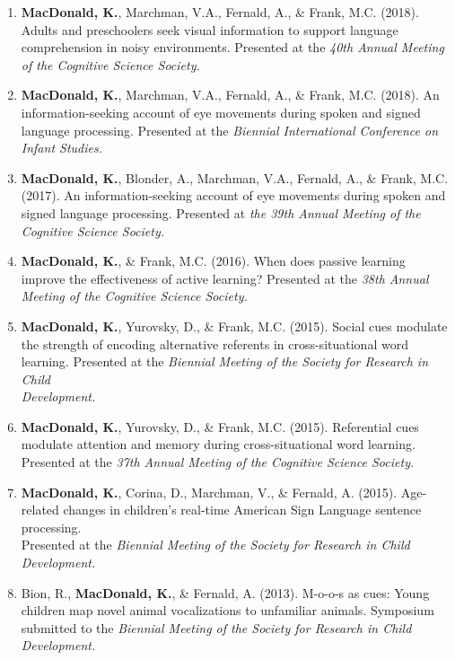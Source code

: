 \documentclass[10pt]{article}
\begin{document}
\begin{enumerate}

        \item {\bf MacDonald, K.}, Marchman, V.A., Fernald, A., \& Frank, M.C. (2018). Adults and preschoolers 
                seek visual information to support language comprehension in noisy environments. 
                Presented at the \emph{40th Annual Meeting of the Cognitive Science Society.}

        \item {\bf MacDonald, K.}, Marchman, V.A., Fernald, A., \& Frank, M.C. (2018). An information-seeking 
                account of eye movements during spoken and signed language processing. Presented at the \emph{Biennial 
                International Conference on Infant Studies.}

        \item {\bf MacDonald, K.}, Blonder, A., Marchman, V.A., Fernald, A., \& Frank, M.C. (2017). An information-seeking 
                account of eye movements during spoken and signed language processing. Presented at \emph{the 39th Annual 
                Meeting of the Cognitive Science Society.}

        \item {\bf MacDonald, K.}, \& Frank, M.C. (2016). When does passive learning improve the effectiveness of active 
                learning? Presented at the \emph{38th Annual Meeting of the Cognitive Science Society.}

        \item {\bf MacDonald, K.}, Yurovsky, D., \& Frank, M.C. (2015). Social cues modulate the strength of encoding 
                alternative referents in cross-situational word learning. Presented at the \emph{Biennial Meeting of 
                the Society for Research in Child \\ Development.}
        
        \item {\bf MacDonald, K.}, Yurovsky, D., \& Frank, M.C. (2015). Referential cues modulate attention and memory 
                during cross-situational word learning. Presented at the \emph{37th Annual Meeting of the Cognitive 
                Science Society.}
         
        \item {\bf MacDonald, K.}, Corina, D., Marchman, V., \& Fernald, A. (2015). Age-related changes in children's 
                real-time American Sign Language sentence processing. \\ Presented at the \emph{Biennial Meeting of the 
                Society for Research in Child \\Development.}

        \item Bion, R., {\bf MacDonald, K.}, \& Fernald, A. (2013). M-o-o-s as cues: Young children map novel animal 
                vocalizations to unfamiliar animals. Symposium submitted to the \emph{Biennial Meeting of the Society 
                for Research in Child Development.}

\end{enumerate}
\end{document}
